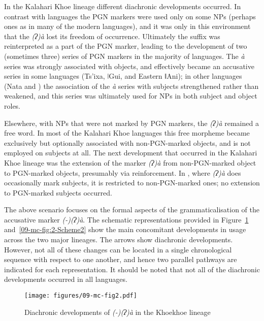 \documentclass[output=paper]{LSP/langsci}
\begin{document}
In the Kalahari Khoe lineage different diachronic developments occurred. In contrast with  languages the PGN markers were used only on some NPs (perhaps  ones as in many of the modern languages), and it was only in this environment that the \textit{(ʔ)à} lost its freedom of occurrence. Ultimately the suffix was reinterpreted as a part of the PGN marker, leading to the development of two (sometimes three) series of PGN markers in the majority of languages. The \textit{à} series was strongly associated with objects, and effectively became an accusative series in some languages (Ts’ixa, ǀGui, and Eastern ǁAni); in other languages (\eg Nata  and ) the association of the \textit{à} series with subjects strengthened rather than weakened, and this series was ultimately used for NPs in both subject and object roles.

Elsewhere, \ie with NPs that were not marked by PGN markers, the \textit{(ʔ)à} remained a free word. In most of the Kalahari Khoe languages this free morpheme became exclusively but optionally associated with non-PGN-marked objects, and is not employed on subjects at all. The next development that occurred in the Kalahari Khoe lineage was the extension of the marker \textit{(ʔ)à} from non-PGN-marked object to PGN-marked objects, presumably via reinforcement. In , where \textit{(ʔ)à} does occasionally mark subjects, it is restricted to non-PGN-marked ones; no extension to PGN-marked subjects occurred.

The above scenario focuses on the formal aspects of the grammaticalisation of the accusative marker \textit{(-)(ʔ)à}. The schematic representations provided in Figure~\ref{09-mc-fig:2-Scheme} and~\ref{09-mc-fig:2-Scheme2} show the main concomitant developments in usage across the two major lineages. The arrows show diachronic developments. However, not all of these changes can be located in a single chronological sequence with respect to one another, and hence two parallel pathways are indicated for each representation. It should be noted that not all of the diachronic developments occurred in all languages.


\begin{figure} %
	 
	\texttt{[image: figures/09-mc-fig2.pdf]} %
	\caption{Diachronic developments of \textit{(-)(ʔ)à} in the Khoekhoe lineage}\label{09-mc-fig:2-Scheme}
\end{figure}
\end{document}

